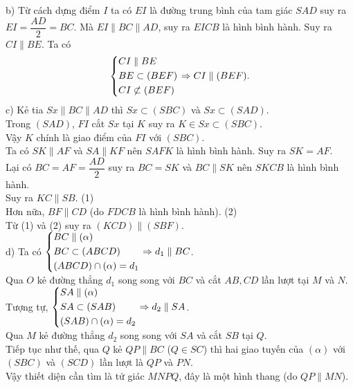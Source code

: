 \begin{bt}
{{
	}
\noindent	b) Từ cách dựng điểm $I$ ta có $EI$ là đường trung bình của tam giác $SAD$ suy ra $EI=\dfrac{AD}{2}=BC$. Mà $EI\parallel BC\parallel AD$, suy ra $EICB$ là hình bình hành. Suy ra $CI\parallel BE$. Ta có $$\left\{\begin{aligned}& CI\parallel BE\\ & BE\subset (BEF)\\ & CI\not\subset(BEF)\end{aligned}\right.\Rightarrow CI\parallel (BEF).$$
	c) Kẻ tia $Sx\parallel BC\parallel AD$ thì $Sx\subset (SBC)$ và $Sx\subset (SAD)$.\\
	Trong $(SAD)$, $FI$ cắt $Sx$ tại $K$ suy ra $K\in Sx\subset(SBC)$.\\
	Vậy $K$ chính là giao điểm của $FI$ với $(SBC)$.\\
	Ta có $SK\parallel AF$ và $SA\parallel KF$ nên $SAFK$ là hình bình hành. Suy ra $SK=AF$.\\
	Lại có $BC=AF=\dfrac{AD}{2}$ suy ra $BC=SK$ và $BC\parallel SK$ nên $SKCB$ là hình bình hành.\\
	Suy ra $KC\parallel SB$. \hfil (1)\\
	Hơn nữa, $BF\parallel CD$ (do $FDCB$ là hình bình hành). \hfil (2)\\
	Từ (1) và (2) suy ra $(KCD)\parallel (SBF)$.\\
	d) Ta có $\left\{\begin{aligned}& BC\parallel (\alpha)\\ & BC\subset (ABCD)\\ & (ABCD)\cap(\alpha)=d_1\end{aligned}\right.\Rightarrow d_1\parallel BC$.\\
	Qua $O$ kẻ đường thẳng $d_1$ song song với $BC$ và cắt $AB,CD$ lần lượt tại $M$ và $N$.\\
	Tượng tự, $\left\{\begin{aligned}& SA\parallel (\alpha)\\ & SA\subset (SAB)\\ & (SAB)\cap(\alpha)=d_2\end{aligned}\right.\Rightarrow d_2\parallel SA$.\\
	Qua $M$ kẻ đường thẳng $d_2$ song song với $SA$ và cắt $SB$ tại $Q$.\\
	Tiếp tục như thế, qua $Q$ kẻ $QP\parallel BC$ ($Q\in SC$) thì hai giao tuyến của $(\alpha)$ với $(SBC)$ và $(SCD)$ lần lượt là $QP$ và $PN$.\\
	Vậy thiết diện cần tìm là tứ giác $MNPQ$, đây là một hình thang (do $QP\parallel MN$).
	}
\end{bt}



